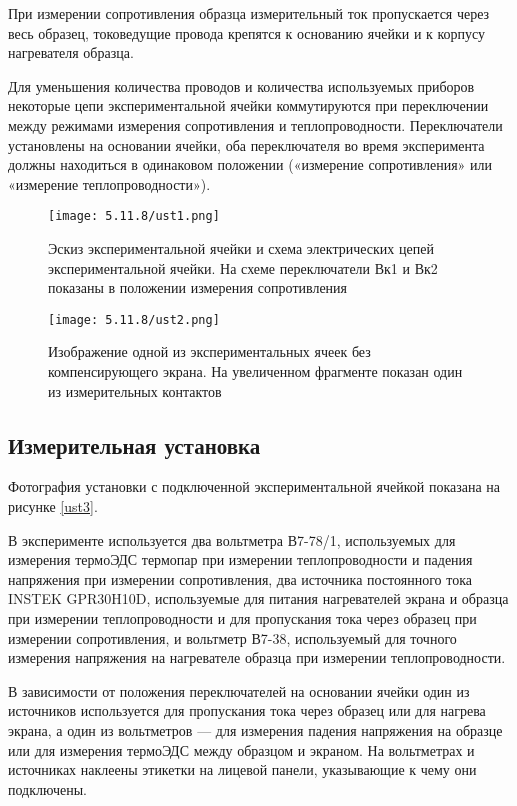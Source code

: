 \documentclass[a4paper,12pt]{article} %
\begin{document}
При измерении сопротивления образца измерительный ток пропускается через весь образец, токоведущие провода крепятся к основанию ячейки и к корпусу нагревателя образца.

Для уменьшения количества проводов и количества используемых приборов некоторые цепи экспериментальной ячейки коммутируются при переключении между режимами измерения сопротивления и теплопроводности. Переключатели установлены на основании ячейки, оба переключателя во время эксперимента должны находиться в одинаковом положении («измерение сопротивления» или «измерение теплопроводности»).

\begin{figure}[H]
    \centering
    \texttt{[image: 5.11.8/ust1.png]}
    \caption{Эскиз экспериментальной ячейки и схема электрических цепей экспериментальной ячейки. На схеме переключатели Вк1 и Вк2 показаны в положении измерения сопротивления}
    \label{ust1}
\end{figure}

\begin{figure}[H]
    \centering
    \texttt{[image: 5.11.8/ust2.png]}
    \caption{Изображение одной из экспериментальных ячеек без компенсирующего экрана. На увеличенном фрагменте показан один из измерительных контактов}
    \label{ust2}
\end{figure}

\subsection{Измерительная установка}

Фотография установки с подключенной экспериментальной ячейкой показана на рисунке \ref{ust3}.

В эксперименте используется два вольтметра В7-78/1, используемых для измерения термоЭДС термопар при измерении теплопроводности и падения напряжения при измерении сопротивления, два источника постоянного тока INSTEK GPR30H10D, используемые для питания нагревателей экрана и образца при измерении теплопроводности и для пропускания тока через образец при измерении сопротивления, и вольтметр В7-38, используемый для точного измерения напряжения на нагревателе образца при измерении теплопроводности.

В зависимости от положения переключателей на основании ячейки один из источников используется для пропускания тока через образец или для нагрева экрана, а один из вольтметров — для измерения падения напряжения на образце или для измерения термоЭДС между образцом и экраном. На вольтметрах и источниках наклеены этикетки на лицевой панели, указывающие к чему они подключены.
\end{document}
